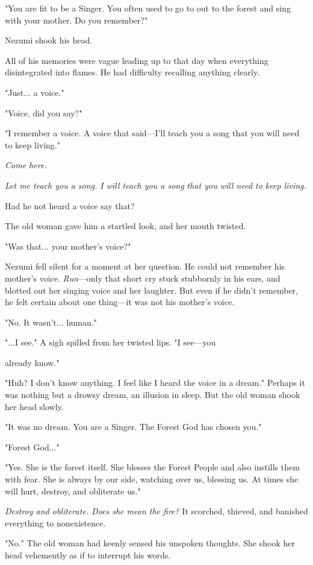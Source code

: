 "You are fit to be a Singer. You often used to go to out to the forest
and sing with your mother. Do you remember?"

Nezumi shook his head.

All of his memories were vague leading up to that day when everything
disintegrated into flames. He had difficulty recalling anything clearly.

"Just... a voice."

"Voice, did you say?"

"I remember a voice. A voice that said---I'll teach you a song that you
will need to keep living."

\emph{Come here.}

\emph{Let me teach you a song. I will teach you a song that you will need to
keep living.}

Had he not heard a voice say that?

The old woman gave him a startled look, and her mouth twisted.

"Was that... your mother's voice?"

Nezumi fell silent for a moment at her question. He could not remember
his mother's voice. \emph{Run}---only that short cry stuck stubbornly in his
ears, and blotted out her singing voice and her laughter. But even if he
didn't remember, he felt certain about one thing---it was not his mother's
voice.

"No. It wasn't... human."

"...I see." A sigh spilled from her twisted lips. "I see---you~

already know."

"Huh? I don't know anything. I feel like I heard the voice in a dream."
Perhaps it was nothing but a drowsy dream, an illusion in sleep. But the
old woman shook her head slowly.

"It was no dream. You are a Singer. The Forest God has chosen you."

"Forest God..."

"Yes. She is the forest itself. She blesses the Forest People and also
instills them with fear. She is always by our side, watching over us,
blessing us. At times she will hurt, destroy, and obliterate us."

\emph{Destroy and obliterate. Does she mean the fire?} It scorched, thieved,
and banished everything to nonexistence.

"No." The old woman had keenly sensed his unspoken thoughts. She shook
her head vehemently as if to interrupt his words.

